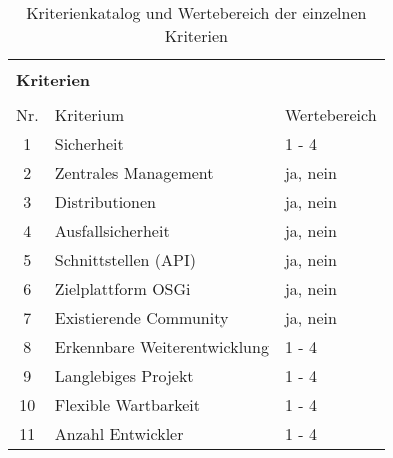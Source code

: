 \begin{table}[H]
 \centering
 \caption{Kriterienkatalog und Wertebereich der einzelnen Kriterien}
 \begin{tabular}{c|l|l}
 \multicolumn{3}{l}{}\\
  \multicolumn{3}{l}{\textbf{Kriterien}}\\
  \multicolumn{3}{l}{}\\
  \toprule
  Nr. &  Kriterium & Wertebereich \\
  \midrule
  1 & Sicherheit 
  & 1 - 4 \\
  
  2 & Zentrales Management 
  & ja, nein \\
  
  3 & Distributionen
  & ja, nein \\
  
  4 & Ausfallsicherheit
  & ja, nein\\
  
  5 & Schnittstellen (\ac{API})
  & ja, nein\\
  
  6 & Zielplattform OSGi
  & ja, nein\\
  
  7 & Existierende Community
  & ja, nein \\
  
  8 & Erkennbare Weiterentwicklung 
  & 1 - 4\\
  
  9 & Langlebiges Projekt 
  & 1 - 4\\
  
  10 & Flexible Wartbarkeit 
  & 1 - 4\\
  
  11 & Anzahl Entwickler 
  & 1 - 4\\
  \bottomrule
 \end{tabular}
 \label{tab:anforderungsliste}
\end{table}